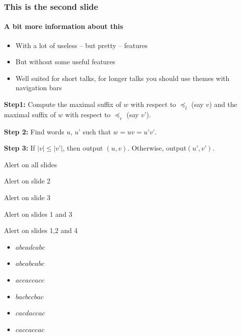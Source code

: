 \documentclass{beamer}
\begin{document}
\begin{frame}
	\frametitle{This is the second slide}
	\framesubtitle{A bit more information about this}
	  \begin{itemize}
  \item With a lot of useless -- but pretty -- features
  \item But without some useful features
  \item Well suited for short talks, for longer talks you should use themes
        with navigation bars
  \end{itemize}
\end{frame}


\begin{frame}
\textbf{Step1:} Compute the maximal suffix of $w$ with respect to $\preceq_l$ (say $v$) and the
maximal suffix of $w$ with respect to $\preceq_r$ (say $v’$).
\pause

\textbf{Step 2:} Find words $u$, $u’$ such that
$w = uv = u’v’$.
\pause

\textbf{Step 3:} If $|v| \le |v’|$, then output
$(u,v)$. Otherwise, output$(u’,v’)$.
\end{frame}


\begin{frame}
    \alert{Alert on all slides}

    \alert<2>{Alert on slide 2}

    \alert<3>{Alert on slide 3}

    \alert<1,3>{Alert on slides 1 and 3}

    \alert<-2,4>{Alert on slides 1,2 and 4}
\end{frame}



\begin{frame}
\begin{itemize}
    \item<1> $abcadcabc$
    \item<1-2> $abcabcabc$
    \item<1-2> $accaccacc$
    \item<1> $bacbccbac$
    \item<1,3> $cacdaccac$
    \item<1-2> $caccaccac$
\end{itemize}
\end{frame}
\end{document}
